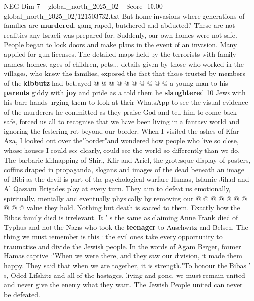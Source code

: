 \begin{textsample}{NEG Dim 7 – global\_north\_2025\_02 – Score -10.00 – global\_north\_2025\_02/121503732.txt}
But home invasions where generations of families are \textbf{murdered}, gang raped, butchered and abducted?
These are not realities any Israeli was prepared for.
Suddenly, our own homes were not safe.
People began to lock doors and make plans in the event of an invasion.
Many applied for gun licenses.
The detailed maps held by the terrorists with family names, homes, ages of children, pets... details given by those who worked in the villages, who knew the families, exposed the fact that those trusted by members of the \textbf{kibbutz} had betrayed @ @ @ @ @ @ @ @ @ @ a young man to his \textbf{parents} giddy with \textbf{joy} and pride as a told them he \textbf{slaughtered} 10 Jews with his bare hands urging them to look at their WhatsApp to see the visual evidence of the murderers he committed as they praise God and tell him to come back safe, forced us all to recognise that we have been living in a fantasy world and ignoring the festering rot beyond our border.
When I visited the ashes of Kfar Aza, I looked out over the"border"and wondered how people who live so close, whose houses I could see clearly, could see the world so differently than we do.
The barbaric kidnapping of Shiri, Kfir and Ariel, the grotesque display of posters, coffins draped in propaganda, slogans and images of the dead beneath an image of Bibi as the devil is part of the psychological warfare Hamas, Islamic Jihad and Al Qassam Brigades play at every turn.
They aim to defeat us emotionally, spiritually, mentally and eventually physically by removing our @ @ @ @ @ @ @ @ @ @ value they hold.
Nothing but death is sacred to them.
Exactly how the Bibas family died is irrelevant.
It ' s the same as claiming Anne Frank died of Typhus and not the Nazis who took the \textbf{teenager} to Auschwitz and Belsen.
The thing we must remember is this : the evil ones take every opportunity to traumatise and divide the Jewish people.
In the words of Agam Berger, former Hamas captive :"When we were there, and they saw our division, it made them happy.
They said that when we are together, it is strength."To honour the Bibas ' s, Oded Lifshitz and all of the hostages, living and gone, we must remain united and never give the enemy what they want.
The Jewish People united can never be defeated.

\end{textsample}
